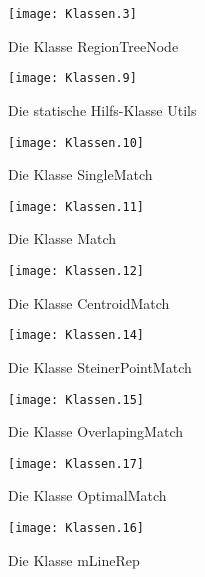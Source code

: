 \begin{appendix}
 \begin{figure}	
	\texttt{[image: Klassen.3]}
	\caption{Die Klasse RegionTreeNode}
	\label{fig:UML_RTN}
\end{figure}

\begin{figure}	
	\texttt{[image: Klassen.9]}
	\caption{Die statische Hilfs-Klasse Utils}
	\label{fig:UML_Utils}
\end{figure}

\begin{figure}	
	\texttt{[image: Klassen.10]}
	\caption{Die Klasse SingleMatch}
	\label{fig:UML_SingleMatch}
\end{figure}

\begin{figure}	
	\texttt{[image: Klassen.11]}
	\caption{Die Klasse Match}
	\label{fig:UML_Match}
\end{figure}

\begin{figure}	
	\texttt{[image: Klassen.12]}
	\caption{Die Klasse CentroidMatch}
	\label{fig:UML_CMatch}
\end{figure}


\begin{figure}	
	\texttt{[image: Klassen.14]}
	\caption{Die Klasse SteinerPointMatch}
	\label{fig:UML_SMatch}
\end{figure}

\begin{figure}	
	\texttt{[image: Klassen.15]}
	\caption{Die Klasse OverlapingMatch}
	\label{fig:UML_OMMatch}
\end{figure}

\begin{figure}	
	\texttt{[image: Klassen.17]}
	\caption{Die Klasse OptimalMatch}
	\label{fig:UML_OptimalMatch}
\end{figure}


\begin{figure}	
	\texttt{[image: Klassen.16]}
	\caption{Die Klasse mLineRep}
	\label{fig:UML_mLineRep}
\end{figure}



  
  
 \printindex
 \setcounter{chapter}{5}



\listoffigures

 \end{appendix}


